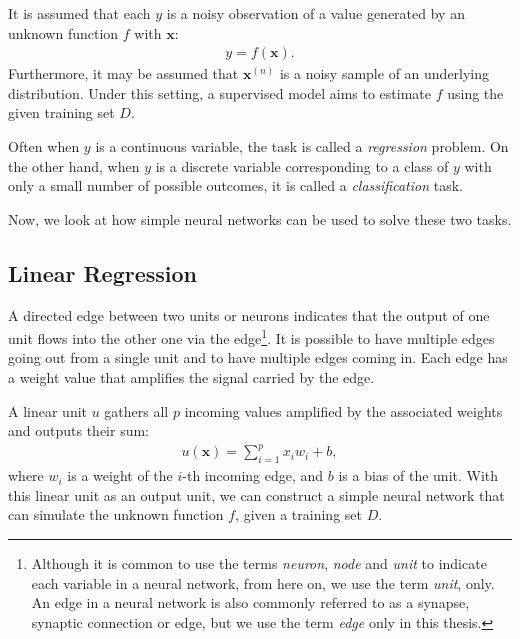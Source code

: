 \documentclass[dissertation,nocontribution,draft*]{aaltoseries}
\newcommand{\vect}[1]{\mathbf{#1}}
\newcommand{\vx}[0]{\vect{x}}
\begin{document}
It is assumed that each $y$ is a noisy observation of a
value generated by an unknown function $f$ with $\vx$:
\begin{align}
    \label{eq:linreg_gen}
    y = f(\vx).
\end{align}
Furthermore, it may be
assumed that $\vx^{(n)}$ is a noisy sample of an underlying
distribution.  Under this setting, a supervised model aims
to estimate $f$ using the given training set $D$.

Often when $y$ is a continuous variable,
the task is called a \textit{regression} problem.
On the other hand, when $y$ is a discrete variable 
corresponding to a class of $y$ with only a small number of
possible outcomes, it is called a \textit{classification}
task.

Now, we look at how simple neural networks can be used to
solve these two tasks.

\subsection{Linear Regression}
\label{sec:linear_regression}

A directed edge between two units or neurons indicates that
the output of one unit flows into the other one via the
edge\footnote{Although it is common to use the terms
\textit{neuron}, \textit{node} and \textit{unit} to indicate
each variable in a neural network, from here on, we use the
term \textit{unit}, only. An edge in a neural network is
also commonly referred to as a synapse, synaptic connection
or edge, but we use the term \textit{edge} only in this
thesis.}. It is possible to have multiple edges going out
from a single unit and to have multiple edges coming in.
Each edge has a weight value that amplifies the signal
carried by the edge.

A linear unit $u$ gathers all $p$ incoming values amplified
by the associated weights and outputs their sum:
\begin{align}
    \label{eq:linear_unit}
    u(\vx) = \sum_{i=1}^p x_i w_i + b, 
\end{align}
where $w_i$ is a weight of the $i$-th incoming edge, and $b$
is a bias of the unit.  With this linear unit as an output
unit, we can construct a simple neural network that can
simulate the unknown function $f$, given a training set $D$. 
\end{document}
